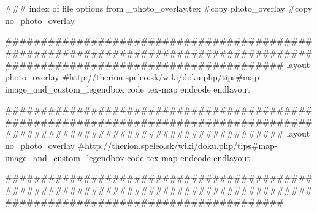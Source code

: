 ### index of file options from _photo_overlay.tex
  #copy photo_overlay
  #copy no_photo_overlay

#############################################################################################################################
layout photo_overlay
  #http://therion.speleo.sk/wiki/doku.php/tips#map-image_and_custom_legendbox
  code tex-map
    \def\maplayout{
      \legendbox{75}{95}{NW}{
        \legendwidth 70 cm
        \the\legendcontent
        }
      \legendbox{1}{55}{NW}{
        \legendwidth 150 cm
        \legendtextsize={\size[30]}
        \hsize=\legendwidth
        
      }
      \legendbox{18} {90} {nw} {\loadpicture{images/Logo_BEC_1250.png}}
      \legendbox{25} {90} {nw} {\loadpicture{images/Logo_GaiaEC_1250.png}}
      \legendbox{32} {90} {nw} {\loadpicture{images/Logo_SMOC_1250.png}}
      \legendbox{00} {85} {nw} {\loadpicture{Region-2/Baggao/bluewater/images/Rich Smith - P4180229.JPG}} 
      \legendbox{00} {84} {nw} {
        \legendwidth 50 cm
        \size[30]
        Blue Water Resurgance (photo: Rich Smith)
        }

      \legendbox{60} {70} {nw} {\loadpicture{Region-2/Baggao/bluewater/images/3A1A9729EDIT1.jpg}} 
      \legendbox{60} {69} {nw} {
        \legendwidth=30cm
        \hsize=30cm
        \size[30]
        White Lightening Entrance (photo: Josh Bratchley)
        }
           
      \legendbox{02} {5} {nw} {\loadpicture{Region-2/Baggao/bluewater/images/BlueWaterEntrance_6K.jpg}} 
      \legendbox{20} {5} {nw} {\loadpicture{Region-2/Baggao/bluewater/images/3A1A9888EDIT1.jpg}} 
      \legendbox{30} {5} {nw} {\loadpicture{Region-2/Baggao/bluewater/images/DSC_0136.jpg}} 
      \legendbox{40} {5} {nw} {\loadpicture{Region-2/Baggao/bluewater/images/DSC_0086.jpg}} 
      \legendbox{65} {5} {nw} {\loadpicture{Region-2/Baggao/bluewater/images/P1010515.JPG}} 
      \legendbox{75} {5} {nw} {\loadpicture{Region-2/Baggao/bluewater/images/P1010255.JPG}} 
    }	
  endcode
endlayout

#############################################################################################################################
layout no_photo_overlay
  #http://therion.speleo.sk/wiki/doku.php/tips#map-image_and_custom_legendbox
  code tex-map
    \def\maplayout{
      \legendbox{75}{95}{NW}{
        \legendwidth 70 cm
        \the\legendcontent
        }
      \legendbox{1}{55}{NW}{
        \legendwidth 150 cm
        \legendtextsize={\size[30]}
        \hsize=\legendwidth
        
      }
    }	
  endcode
endlayout

#############################################################################################################################

